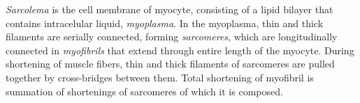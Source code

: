 
\emph{Sarcolema} is the cell membrane of myocyte, consisting of a lipid bilayer that contains intracelular liquid, \emph{myoplasma}. In the myoplasma, thin and thick filaments are serially connected, forming \emph{sarcomeres}, which are longitudinally connected in \emph{myofibrils} that extend through entire length of the myocyte. During shortening of muscle fibers, thin and thick filaments of sarcomeres are pulled together by cross-bridges between them. Total shortening of myofibril is summation of shortenings of sarcomeres of which it is composed.

